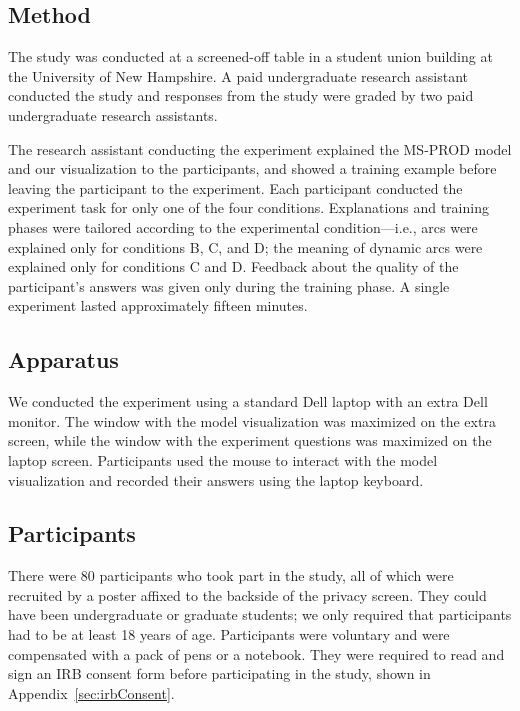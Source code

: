 \subsection{Method}

The study was conducted at a screened-off table in a student union building at the University of New Hampshire.  A paid undergraduate research assistant conducted the study and responses from the study were graded by two paid undergraduate research assistants.

The research assistant conducting the experiment explained the MS-PROD model and our visualization to the participants, and showed a training example before leaving the participant to the experiment.  Each participant conducted the experiment task for only one of the four conditions.  Explanations and training phases were tailored according to the experimental condition---i.e., arcs were explained only for conditions B, C, and D; the meaning of dynamic arcs were explained only for conditions C and D.  Feedback about the quality of the participant's answers was given only during the training phase.  A single experiment lasted approximately fifteen minutes.

\subsection{Apparatus}

We conducted the experiment using a standard Dell laptop with an extra Dell monitor.  The window with the model visualization was maximized on the extra screen, while the window with the experiment questions was maximized on the laptop screen.  Participants used the mouse to interact with the model visualization and recorded their answers using the laptop keyboard.

\subsection{Participants}

There were 80 participants who took part in the study, all of which were recruited by a poster affixed to the backside of the privacy screen.  They could have been undergraduate or graduate students; we only required that participants had to be at least 18 years of age.  Participants were voluntary and were compensated with a pack of pens or a notebook.  They were required to read and sign an IRB consent form before participating in the study, shown in Appendix~\ref{sec:irbConsent}.

